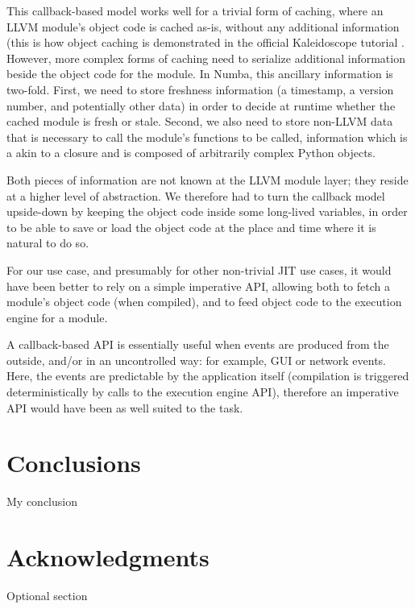 \documentclass{acm_proc_article-sp}
\begin{document}
This callback-based model works well for a trivial form of caching,
where an LLVM module's object code is cached as-is, without any
additional information (this is how object caching is demonstrated in
the official Kaleidoscope tutorial \cite{llvmblog:kaleidoscope}.
However, more complex forms of
caching need to serialize additional information beside the object code
for the module.  In Numba, this ancillary information is two-fold.  First,
we need to store freshness information (a timestamp, a version number,
and potentially other data) in order to decide at runtime whether the
cached module is fresh or stale.  Second, we also need to store non-LLVM
data that is necessary to call the module's functions to be called,
information which is a akin to a closure and is composed of arbitrarily
complex Python objects.

Both pieces of information are not known at the LLVM module layer;
they reside at a higher level of abstraction.  We therefore had to
turn the callback model upside-down by keeping the object code inside
some long-lived variables, in order to be able to save or load
the object code at the place and time where it is natural to do so.

For our use case, and presumably for other non-trivial JIT use cases,
it would have been better to rely on a simple imperative API, allowing
both to fetch a module's object code (when compiled), and to feed object
code to the execution engine for a module.

A callback-based API is essentially useful when events are produced from
the outside, and/or in an uncontrolled way: for example, GUI or network
events.  Here, the events are predictable by the application
itself (compilation is triggered deterministically by calls to the
execution engine API), therefore an imperative API would have been as
well suited to the task.

\section{Conclusions}
My conclusion

\section{Acknowledgments}
Optional section

%

%
%


\end{document}
